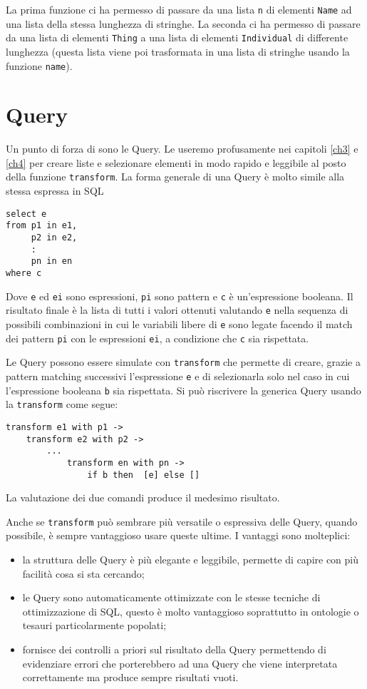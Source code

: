 La prima funzione ci ha permesso di passare da una lista \verb|n| di elementi \verb|Name| ad una lista della stessa lunghezza di stringhe. La seconda ci ha permesso di passare da una lista di elementi \verb|Thing| a una lista di elementi \verb|Individual| di differente lunghezza (questa lista viene poi trasformata in una lista di stringhe usando la funzione \verb|name|).
\section{Query}
Un punto di forza di \cduce sono le Query. Le useremo profusamente nei capitoli \ref{ch3} e \ref{ch4} per creare liste e selezionare elementi in modo rapido e leggibile al posto della  funzione \verb|transform|.
La forma generale di una Query è molto simile alla stessa espressa in SQL
\begin{verbatim}
select e 
from p1 in e1,
	 p2 in e2,
	 :
	 pn in en
where c
\end{verbatim}
Dove \verb|e| ed \verb|ei| sono espressioni, \verb|pi| sono pattern e \verb|c| è un'espressione booleana. Il risultato finale è la lista di tutti i valori ottenuti valutando \verb|e| nella sequenza di possibili combinazioni in cui le variabili libere di \verb|e| sono legate facendo il match dei pattern \verb|pi| con le espressioni \verb|ei|, a condizione che \verb|c| sia rispettata.

Le Query possono essere simulate con \verb|transform| che permette di creare, grazie a pattern matching successivi l'espressione \verb|e| e di selezionarla solo nel caso in cui l'espressione booleana \verb|b| sia rispettata. Si può riscrivere la generica Query usando la \verb|transform| come segue:
\begin{verbatim}
transform e1 with p1 -> 
	transform e2 with p2 -> 
		...
			transform en with pn -> 
				if b then  [e] else []
\end{verbatim}
La valutazione dei due comandi produce il medesimo risultato.

Anche se \verb|transform| può sembrare più versatile o espressiva delle Query, quando possibile, è sempre vantaggioso usare queste ultime. I vantaggi sono molteplici:
\begin{itemize}
	\item la struttura delle Query è più elegante e leggibile, permette di capire con più facilità cosa si sta cercando;
	\item le Query sono automaticamente ottimizzate con le stesse tecniche di ottimizzazione di SQL, questo è molto vantaggioso soprattutto in ontologie o tesauri particolarmente popolati;
	\item \cduce fornisce dei controlli a priori sul risultato della Query permettendo di evidenziare errori che porterebbero ad una Query che viene interpretata correttamente ma produce sempre risultati vuoti.
\end{itemize}

